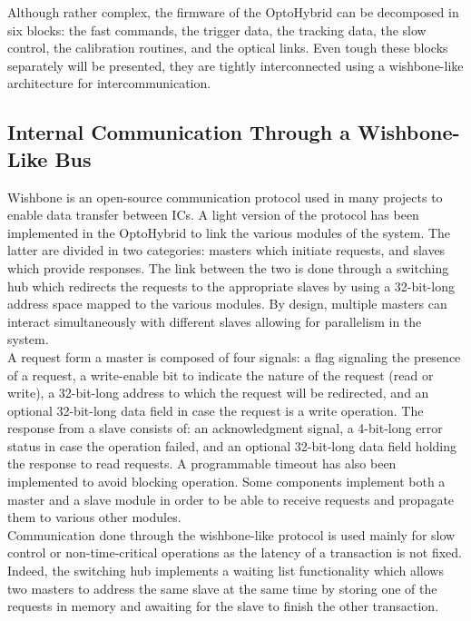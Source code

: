     Although rather complex, the firmware of the OptoHybrid can be decomposed in six blocks: the fast commands, the trigger data, the tracking data, the slow control, the calibration routines, and the optical links. Even tough these blocks separately will be presented, they are tightly interconnected using a wishbone-like architecture for intercommunication.

    \subsection{Internal Communication Through a Wishbone-Like Bus}

      Wishbone is an open-source communication protocol used in many projects to enable data transfer between ICs. A light version of the protocol has been implemented in the OptoHybrid to link the various modules of the system. The latter are divided in two categories: masters which initiate requests, and slaves which provide responses. The link between the two is done through a switching hub which redirects the requests to the appropriate slaves by using a 32-bit-long address space mapped to the various modules. By design, multiple masters can interact simultaneously with different slaves allowing for parallelism in the system. \\

      A request form a master is composed of four signals: a flag signaling the presence of a request, a write-enable bit to indicate the nature of the request (read or write), a 32-bit-long address to which the request will be redirected, and an optional 32-bit-long data field in case the request is a write operation. The response from a slave consists of: an acknowledgment signal, a 4-bit-long error status in case the operation failed, and an optional 32-bit-long data field holding the response to read requests. A programmable timeout has also been implemented to avoid blocking operation. Some components implement both a master and a slave module in order to be able to receive requests and propagate them to various other modules. \\

      Communication done through the wishbone-like protocol is used mainly for slow control or non-time-critical operations as the latency of a transaction is not fixed. Indeed, the switching hub implements a waiting list functionality which allows two masters to address the same slave at the same time by storing one of the requests in memory and awaiting for the slave to finish the other transaction.

